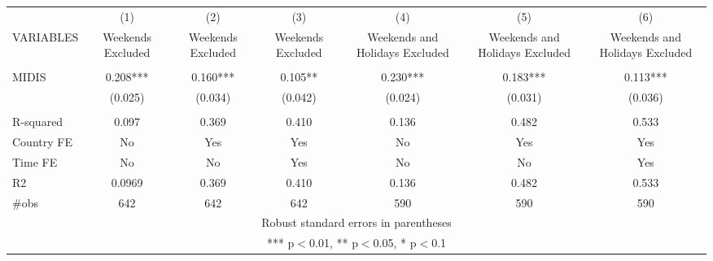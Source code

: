 \documentclass[]{article}
\begin{document}
\begin{tabular}{lcccccc} \hline
 & (1) & (2) & (3) & (4) & (5) & (6) \\
VARIABLES & Weekends Excluded & Weekends Excluded & Weekends Excluded & Weekends and Holidays Excluded & Weekends and Holidays Excluded & Weekends and Holidays Excluded \\ \hline
 &  &  &  &  &  &  \\
MIDIS & 0.208*** & 0.160*** & 0.105** & 0.230*** & 0.183*** & 0.113*** \\
 & (0.025) & (0.034) & (0.042) & (0.024) & (0.031) & (0.036) \\
 &  &  &  &  &  &  \\
R-squared & 0.097 & 0.369 & 0.410 & 0.136 & 0.482 & 0.533 \\
Country FE & No & Yes & Yes & No & Yes & Yes \\
Time FE & No & No & Yes & No & No & Yes \\
R2 & 0.0969 & 0.369 & 0.410 & 0.136 & 0.482 & 0.533 \\
 \#obs & 642 & 642 & 642 & 590 & 590 & 590 \\ \hline
\multicolumn{7}{c}{ Robust standard errors in parentheses} \\
\multicolumn{7}{c}{ *** p$<$0.01, ** p$<$0.05, * p$<$0.1} \\
\end{tabular}
\end{document}
